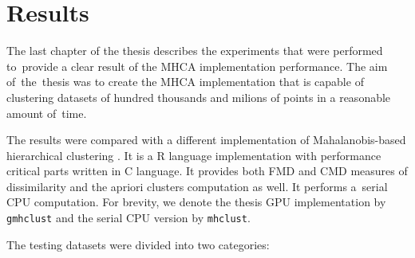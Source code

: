 \chapter{Results}

The last chapter of the thesis describes the experiments that were performed to~provide a clear result of the MHCA implementation performance. The aim of~the~thesis was to create the MHCA implementation that is capable of clustering datasets of hundred thousands and milions of points in a reasonable amount of~time.

The results were compared with a different implementation of Mahalanobis-based hierarchical clustering \cite{fivser2012detection}. It is a R language implementation with performance critical parts written in C language. It provides both FMD and CMD measures of dissimilarity and the apriori clusters computation as well. It performs a~serial CPU computation. For brevity, we denote the thesis GPU implementation by \texttt{gmhclust} and the serial CPU version by \texttt{mhclust}.

The testing datasets were divided into two categories:

